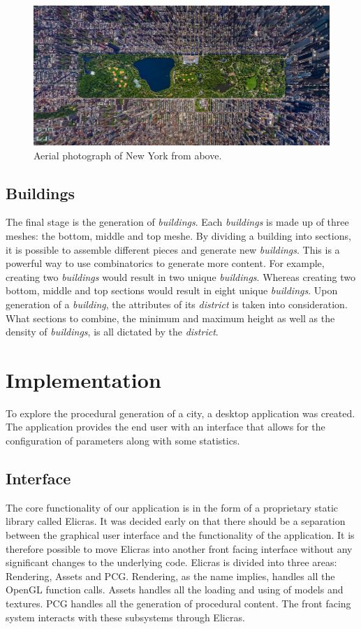 	\begin{figure}[h]
		\centering
		\includegraphics[width=0.9\linewidth]{"Images/new york"}
		\caption{Aerial photograph of New York from above.}
		\label{fig:new-york}
	\end{figure}
		
	\subsection{Buildings}
	The final stage is the generation of \textit{buildings}. Each \textit{buildings} is made up of three meshes: the bottom, middle and top meshe. By dividing a building into sections, it is possible to assemble different pieces and generate new \textit{buildings}. This is a powerful way to use combinatorics to generate more content. For example, creating two \textit{buildings} would result in two unique \textit{buildings}. Whereas creating two bottom, middle and top sections would result in eight unique \textit{buildings}. Upon generation of a \textit{building}, the attributes of its \textit{district} is taken into consideration. What sections to combine, the minimum and maximum height as well as the density of \textit{buildings}, is all dictated by the \textit{district}.

\section{Implementation}
To explore the procedural generation of a city, a desktop application was created. The application provides the end user with an interface that allows for the configuration of parameters along with some statistics. 
	
	\subsection{Interface}
	The core functionality of our application is in the form of a proprietary static library called Elicras. It was decided early on that there should be a separation between the graphical user interface and the functionality of the application. It is therefore possible to move Elicras into another front facing interface without any significant changes to the underlying code. Elicras is divided into three areas: Rendering, Assets and PCG. Rendering, as the name implies, handles all the OpenGL function calls. Assets handles all the loading and using of models and textures. PCG handles all the generation of procedural content. The front facing system interacts with these subsystems through Elicras.
		
